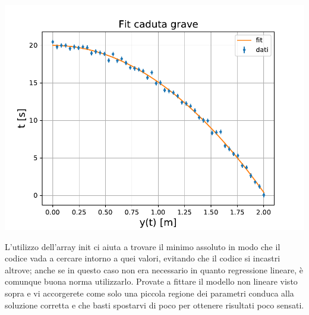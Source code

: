 \documentclass[10pt,a4paper]{article}
\begin{document}
\begin{center}
\includegraphics[scale=0.8]{img/fit_lez.pdf}
\end{center}
L'utilizzo dell'array init ci aiuta a trovare il minimo assoluto in modo che il codice vada a cercare intorno a quei valori, evitando che il codice si incastri altrove; anche se in questo caso non era necessario in quanto regressione lineare, è comunque buona norma utilizzarlo. Provate a fittare il modello non lineare visto sopra e vi accorgerete come solo una piccola regione dei parametri conduca alla soluzione corretta e che basti spostarvi di poco per ottenere risultati poco sensati. 
\end{document}
